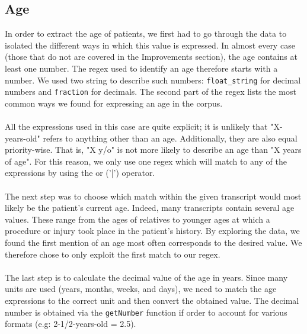 \documentclass[10pt, a4paper, oneside]{article} %
\begin{document}
\subsection*{Age}
In order to extract the age of patients, we first had to go through the data to isolated the different ways in which this value is expressed. In almost every case (those that do not are covered in the Improvements section), the age contains at least one number. The regex used to identify an age therefore starts with a number. We used two string to describe such numbers: \texttt{float\_string} for decimal numbers and \texttt{fraction} for decimals. The second part of the regex lists the most common ways we found for expressing an age in the corpus. \\
\\
All the expressions used in this case are quite explicit; it is unlikely that "X-years-old" refers to anything other than an age. Additionally, they are also equal priority-wise. That is, "X y/o" is not more likely to describe an age than "X years of age". For this reason, we only use one regex which will match to any of the expressions by using the or ('|') operator.\\
\\
The next step was to choose which match within the given transcript would most likely be the patient's current age. Indeed, many transcripts contain several age values. These range from the ages of relatives to younger ages at which a procedure or injury took place in the patient's history. By exploring the data, we found the first mention of an age most often corresponds to the desired value. We therefore chose to only exploit the first match to our regex.\\
\\
The last step is to calculate the decimal value of the age in years. Since many units are used (years, months, weeks, and days), we need to match the age expressions to the correct unit and then convert the obtained value. The decimal number is obtained via the \texttt{getNumber} function if order to account for various formats (e.g: 2-1/2-years-old = 2.5).
\end{document}
